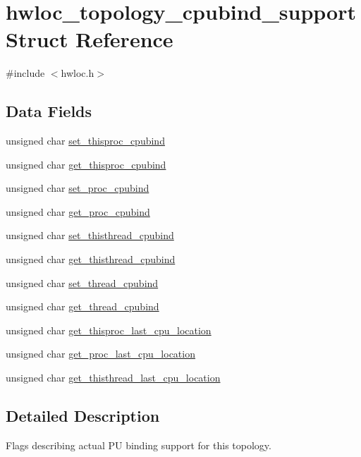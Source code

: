 \hypertarget{a00294}{}\section{hwloc\+\_\+topology\+\_\+cpubind\+\_\+support Struct Reference}
\label{a00294}


{\ttfamily \#include $<$hwloc.\+h$>$}

\subsection*{Data Fields}
\begin{DoxyCompactItemize}
\item 
unsigned char \hyperlink{a00294_a9403d51657a4d546b3ea9553a2973a27}{set\+\_\+thisproc\+\_\+cpubind}
\item 
unsigned char \hyperlink{a00294_a77a09ddd78ee3e9ff5f532a6ac74f7eb}{get\+\_\+thisproc\+\_\+cpubind}
\item 
unsigned char \hyperlink{a00294_aa166223d1c2a6de7256ab2d8b675a87e}{set\+\_\+proc\+\_\+cpubind}
\item 
unsigned char \hyperlink{a00294_aae705bc447adc163ead377362c4dfe9f}{get\+\_\+proc\+\_\+cpubind}
\item 
unsigned char \hyperlink{a00294_a57a89a4b5f1f74fa6cfe176f1e8b0798}{set\+\_\+thisthread\+\_\+cpubind}
\item 
unsigned char \hyperlink{a00294_a80d762e532d677dff262d83cc7bb1c60}{get\+\_\+thisthread\+\_\+cpubind}
\item 
unsigned char \hyperlink{a00294_a46fba33e307909ce256624687799dd6d}{set\+\_\+thread\+\_\+cpubind}
\item 
unsigned char \hyperlink{a00294_a8dd4d8531ed2eebdce1507e7d104154e}{get\+\_\+thread\+\_\+cpubind}
\item 
unsigned char \hyperlink{a00294_ad2d5c94b738d92b7d2ede87e4e96321d}{get\+\_\+thisproc\+\_\+last\+\_\+cpu\+\_\+location}
\item 
unsigned char \hyperlink{a00294_a2554620148b7992a5093f338f5ae254f}{get\+\_\+proc\+\_\+last\+\_\+cpu\+\_\+location}
\item 
unsigned char \hyperlink{a00294_a6be1f042fdce6bf41b4ea39f6f193808}{get\+\_\+thisthread\+\_\+last\+\_\+cpu\+\_\+location}
\end{DoxyCompactItemize}


\subsection{Detailed Description}
Flags describing actual PU binding support for this topology. 

